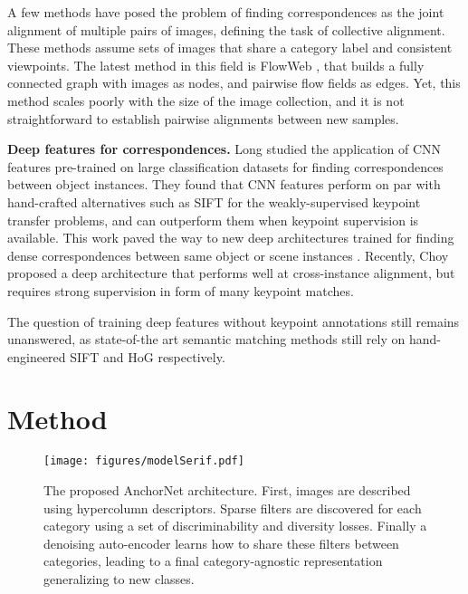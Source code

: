 \documentclass[10pt,twocolumn,letterpaper]{article}
\newcommand{\myparagraph}[1]{\vspace{0.15cm}\noindent\textbf{#1.}}
\begin{document}
A few methods \cite{huang07unsupervised,huang12learning,peng2010rasl,kemelmacher2012collection,mobahi14a,zhou15flowweb} have posed the problem of finding correspondences as the joint alignment of multiple pairs of images, defining the task of collective alignment. These methods assume sets of 
images that share a category label and consistent viewpoints. 
The latest method in this field is FlowWeb \cite{zhou15flowweb}, that builds a fully connected graph with images as nodes, and pairwise flow fields as edges. Yet, this method scales poorly with the size of the image collection, and
it is not straightforward to establish pairwise alignments between new samples.

\myparagraph{Deep features for correspondences}
Long \etal\cite{long2014do} studied the application of CNN features pre-trained on large classification datasets for finding correspondences between object instances. 
They found that CNN features perform on par with hand-crafted alternatives such as SIFT for the weakly-supervised keypoint transfer problems, and can outperform them when keypoint supervision is available. 
This work paved the way to new deep architectures trained for finding dense correspondences between same object or scene instances \cite{dosovitskiy14flownet,zbontar16stereo,thewlis16fully-trainable}. 
Recently, Choy \etal\cite{choy16universal} proposed a deep architecture that performs well at cross-instance alignment, but requires 
strong supervision in form of many keypoint matches.

The question of training deep features without keypoint annotations still remains unanswered, as state-of-the art semantic matching methods \cite{kim2013deformable,ham2016} still rely on hand-engineered SIFT and HoG respectively.
\section{Method}\label{sec:method}\begin{figure*}[ht!]
  \centering
  \texttt{[image: figures/modelSerif.pdf]}
  \caption{The proposed AnchorNet architecture. First, images are described using hypercolumn descriptors. Sparse filters are discovered for each category using a set of discriminability and diversity losses. Finally a denoising auto-encoder learns how to share these filters between categories, leading to a final category-agnostic representation generalizing to new classes.}
  \label{fig:architecture}
  \vspace{-0.2cm}
\end{figure*}
\end{document}
